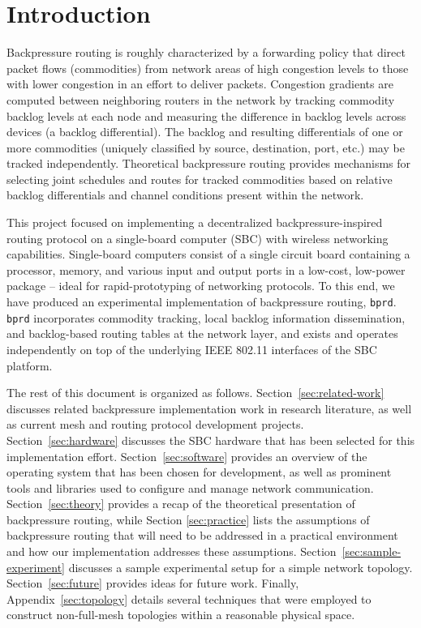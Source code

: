 \documentclass{article}
\newcommand{\bprd}{\texttt{bprd}\xspace}
\begin{document}
\setcounter{tocdepth}{2}
\tableofcontents
\newpage


\section{Introduction}\label{sec:introduction}

Backpressure routing is roughly characterized by a forwarding policy that direct packet flows (commodities) from network areas of high congestion levels to those with lower congestion in an effort to deliver packets.
Congestion gradients are computed between neighboring routers in the network by tracking commodity backlog levels at each node and measuring the difference in backlog levels across devices (a backlog differential).
The backlog and resulting differentials of one or more commodities (uniquely classified by source, destination, port, etc.) may be tracked independently.
Theoretical backpressure routing provides mechanisms for selecting joint schedules and routes for tracked commodities based on relative backlog differentials and channel conditions present within the network.


This project focused on implementing a decentralized backpressure-inspired routing protocol on a single-board computer (SBC) with wireless networking capabilities.
Single-board computers consist of a single circuit board containing a processor, memory, and various input and output ports in a low-cost, low-power package -- ideal for rapid-prototyping of networking protocols.
To this end, we have produced an experimental implementation of backpressure routing, \bprd.
\bprd incorporates commodity tracking, local backlog information dissemination, and backlog-based routing tables at the network layer, and exists and operates independently on top of the underlying IEEE 802.11 interfaces of the SBC platform.


The rest of this document is organized as follows.
Section~\ref{sec:related-work} discusses related backpressure implementation work in research literature, as well as current mesh and routing protocol development projects.
Section~\ref{sec:hardware} discusses the SBC hardware that has been selected for this implementation effort.
Section~\ref{sec:software} provides an overview of the operating system that has been chosen for development, as well as prominent tools and libraries used to configure and manage network communication.
Section~\ref{sec:theory} provides a recap of the theoretical presentation of backpressure routing, while Section \ref{sec:practice} lists the assumptions of backpressure routing that will need to be addressed in a practical environment and how our implementation addresses these assumptions.
Section~\ref{sec:sample-experiment} discusses a sample experimental setup for a simple network topology.
Section~\ref{sec:future} provides ideas for future work.
Finally, Appendix~\ref{sec:topology} details several techniques that were employed to construct non-full-mesh topologies within a reasonable physical space.
\end{document}
